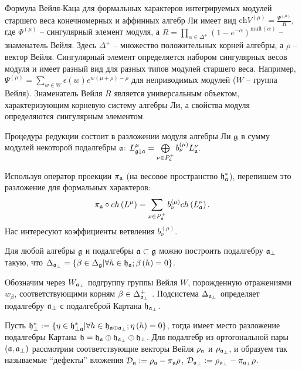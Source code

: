 \documentclass[14pt,autoref,href,facsimile
]{disser}
\begin{document}
Формула Вейля-Каца для формальных характеров интегрируемых модулей старшего веса конечномерных и аффинных алгебр Ли имеет вид $\mathrm{ch} V^{(\mu)} = \frac{\Psi^{(\mu)}}{R}$,
где $\Psi^{(\mu)}$ -- сингулярный элемент модуля, а $R=\prod_{\alpha\in \Delta^+}(1-e^{-\alpha})^{\mathrm{mult}(\alpha)}$ -- знаменатель Вейля. Здесь $\Delta^+$ -- множество положительных корней алгебры, а $\rho$ -- вектор Вейля. Сингулярный элемент определяется набором сингулярных весов модуля и имеет разный вид для разных типов модулей старшего веса. Например, $\Psi^{(\mu)}=\sum_{w\in W} \epsilon(w) e^{w(\mu+\rho)-\rho}$ для неприводимых модулей ($W$ -- группа Вейля). Знаменатель  Вейля $R$ является универсальным объектом, характеризующим корневую систему алгебры Ли, а свойства модуля определяются сингулярным элементом.

Процедура редукции состоит в разложении модуля алгебры Ли $\mathfrak{g}$ в сумму модулей некоторой подалгебры $\mathfrak{a}$:
$ L_{\mathfrak{g}\downarrow \mathfrak{a}}^{\mu }=\bigoplus
\limits_{\nu \in P_{\mathfrak{a}}^{+}}b_{\nu }^{\left( \mu \right) }L_{\mathfrak{a}}^{\nu }.$

Используя оператор проекции  $\pi_{\mathfrak{a}}$ (на весовое пространство $\mathfrak{h}_{\mathfrak{a}}^*$), перепишем это разложение для формальных характеров: 
\begin{equation}
\label{branching1}
 \pi _{\mathfrak{a}}\circ ch\left( L^{\mu }\right)
 =\sum_{\nu \in P_{\mathfrak{a}}^{+}}b_{\nu }^{(\mu)}ch\left( L_{\mathfrak{a}}^{\nu }\right) .
\end{equation}
Нас интересуют коэффициенты ветвления $b^{(\mu)}_{\nu}$.

Для любой алгебры $\mathfrak{g}$ и подалгебры $\mathfrak{a}\subset \mathfrak{g}$ можно построить  подалгебру $\mathfrak{a}_{\perp}$ такую, что $\Delta _{\mathfrak{a}_{\perp }} =\left\{ \beta \in \Delta _{\mathfrak{g}}| \forall h \in \mathfrak{h}_{\mathfrak{a}};  \beta\left(h \right)=0  \right\}$.

Обозначим через $W_{\mathfrak{a}_{\perp}}$ подгруппу группы Вейля $W$, порожденную отражениями $w _{\beta }$, соответствующими корням $\beta \in \Delta _{\mathfrak{a}_{\perp}}^{+}$ . Подсистема  $\Delta _{\mathfrak{a}_{\perp }}$ определяет подалгебру $\mathfrak{a}_{\perp }$ с подалгеброй Картана $\mathfrak{h}_{\mathfrak{a}_{\perp}}$.  

Пусть
$\mathfrak{h}_{\perp }^{\ast }:=\left\{ \eta \in \mathfrak{h}_{\perp \mathfrak{a}}^{\ast
}|\forall h \in \mathfrak{h}_{\mathfrak{a}\oplus \mathfrak{a}_{\perp}}; \eta \left( h \right)=0 \right\}$, тогда имеет место разложение подалгебры Картана $\mathfrak{h}=\frak{\mathfrak{h}_{\mathfrak{a}}}\oplus \mathfrak{h}_{\mathfrak{a}_{\perp}}\oplus\mathfrak{h}_{\perp }$.
Для подалгебр из ортогональной пары  $\left( \mathfrak{a},\mathfrak{a}_{\perp}\right) $ рассмотрим соответствующие векторы Вейля $\rho _{\mathfrak{a}}$ и $\rho _{\mathfrak{a}_{\perp }}$, и образуем так называемые  ``дефекты'' вложения $\mathcal{D}_{\mathfrak{a}}:=\rho _{\mathfrak{a}}-\pi _{\mathfrak{a}}\rho$, $\mathcal{D}_{\mathfrak{a}_{\perp }}:=\rho _{\mathfrak{a}_{\perp }}-\pi_{\mathfrak{a}_{\perp}}\rho$.
\end{document}
